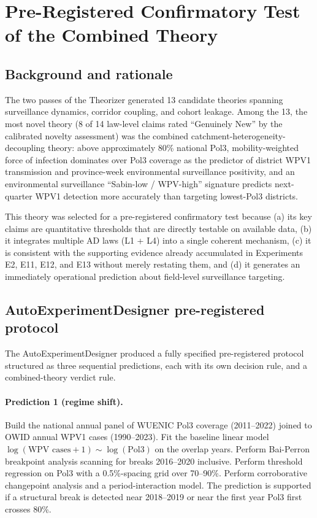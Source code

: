 \documentclass[11pt]{article}
\begin{document}
\section{Pre-Registered Confirmatory Test of the Combined Theory}
\label{sec:final}

\subsection{Background and rationale}

The two passes of the Theorizer generated 13 candidate theories spanning surveillance dynamics, corridor coupling, and cohort leakage. Among the 13, the most novel theory (8 of 14 law-level claims rated ``Genuinely New'' by the calibrated novelty assessment) was the combined catchment-heterogeneity-decoupling theory: above approximately 80\% national Pol3, mobility-weighted force of infection dominates over Pol3 coverage as the predictor of district WPV1 transmission and province-week environmental surveillance positivity, and an environmental surveillance ``Sabin-low / WPV-high'' signature predicts next-quarter WPV1 detection more accurately than targeting lowest-Pol3 districts.

This theory was selected for a pre-registered confirmatory test because (a) its key claims are quantitative thresholds that are directly testable on available data, (b) it integrates multiple AD laws (L1 + L4) into a single coherent mechanism, (c) it is consistent with the supporting evidence already accumulated in Experiments E2, E11, E12, and E13 without merely restating them, and (d) it generates an immediately operational prediction about field-level surveillance targeting.

\subsection{AutoExperimentDesigner pre-registered protocol}

The AutoExperimentDesigner produced a fully specified pre-registered protocol structured as three sequential predictions, each with its own decision rule, and a combined-theory verdict rule.

\paragraph{Prediction 1 (regime shift).} Build the national annual panel of WUENIC Pol3 coverage (2011--2022) joined to OWID annual WPV1 cases (1990--2023). Fit the baseline linear model $\log(\text{WPV cases} + 1) \sim \log(\text{Pol3})$ on the overlap years. Perform Bai-Perron breakpoint analysis scanning for breaks 2016--2020 inclusive. Perform threshold regression on Pol3 with a 0.5\%-spacing grid over 70--90\%. Perform corroborative changepoint analysis and a period-interaction model. The prediction is supported if a structural break is detected near 2018--2019 or near the first year Pol3 first crosses 80\%.
\end{document}
